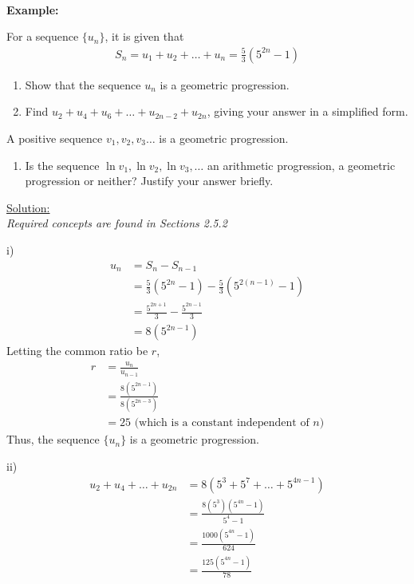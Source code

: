 \documentclass[12pt, a4paper, titlepage]{article}
\begin{document}
\textbf{\\ Example:}

For a sequence $\{u_n\}$, it is given that
\begin{align*}
    S_n = u_1 + u_2 + \dots + u_n = \frac{5}{3}(5^{2n} - 1)
\end{align*}

\begin{enumerate}[label=(\roman*)]
    \item Show that the sequence ${u_n}$ is a geometric progression.
    \item Find $u_2 + u_4 + u_6 + \dots + u_{2n - 2} + u_{2n}$, giving your answer in a simplified form.
\end{enumerate}

A positive sequence $v_1, v_2, v_3 \dots$ is a geometric progression.
\begin{enumerate}[resume, label=(\roman*)]
    \item Is the sequence $\ln v_1, \ln v_2, \ln v_3, \dots$ an arithmetic progression, a geometric progression or neither? Justify your answer briefly.
\end{enumerate}

\begin{flushright}
\end{flushright}

\underline{Solution:} \\
\emph{Required concepts are found in Sections 2.5.2}

i)
\begin{align*}
    u_n &= S_n - S_{n - 1} \\
    &= \frac{5}{3}(5^{2n} - 1) - \frac{5}{3}(5^{2(n - 1)} - 1) \\
    &= \frac{5^{2n + 1}}{3} - \frac{5^{2n - 1}}{3} \\
    &= 8(5^{2n - 1})
\end{align*}
Letting the common ratio be $r$,
\begin{align*}
    r &= \frac{u_n}{u_{n - 1}} \\
    &= \frac{8(5^{2n - 1})}{8(5^{2n - 3})} \\
    &= 25 \text{ (which is a constant independent of } n \text{)}
\end{align*}
Thus, the sequence $\{u_n\}$ is a geometric progression.

ii)
\begin{align*}
    u_2 + u_4 + \dots + u_{2n} &= 8(5^3 + 5^7 + \dots + 5^{4n - 1}) \\
    &= \frac{8(5^3)(5^{4n} - 1)}{5^4 - 1} \\
    &= \frac{1000(5^{4n} - 1)}{624} \\
    &= \frac{125(5^{4n} - 1)}{78}
\end{align*}
\end{document}
